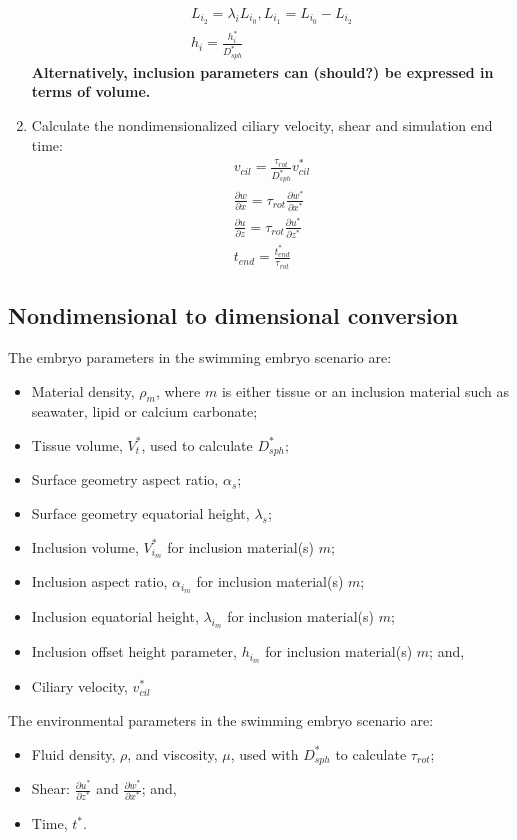 \documentclass[10pt,a4paper]{article}
\def\non{\nonumber}
\def\p{\partial}
\begin{document}
\begin{enumerate}
\begin{eqnarray}
		L_{i_2} = \lambda_i L_{i_0}, L_{i_1} = L_{i_0} - L_{i_2} \non \\
		h_i = \frac{h^*_i}{D_{sph}^*}
	\end{eqnarray}
\textbf{Alternatively, inclusion parameters can (should?) be expressed in terms of volume.}
	\item Calculate the nondimensionalized ciliary velocity, shear and simulation end time:
	\begin{eqnarray}\label{d2ndpars5}
		v_{cil} = \frac{{\tau_{rot}}}{D_{sph}^*}  v^*_{cil} \non \\
		\frac{\p w}{\p x} = \tau_{rot} \frac{\p w^*}{\p x^*} \non \\
		\frac{\p u}{\p z} = \tau_{rot} \frac{\p u^*}{\p z^*} \non \\
		t_{end} = \frac{t^*_{end}}{\tau_{rot}}
	\end{eqnarray}
\end{enumerate}
 
\subsection{Nondimensional to dimensional conversion}


The embryo parameters in the swimming embryo scenario are:
\begin{itemize}
	\item Material density, $\rho_m$, where $m$ is either tissue or an inclusion material such as seawater, lipid or calcium carbonate;
	\item Tissue volume, $V^*_t$, used to calculate $D_{sph}^*$;
	\item Surface geometry aspect ratio, $\alpha_s$;
	\item Surface geometry equatorial height, $\lambda_s$;
	\item Inclusion volume, $V^*_{i_m}$ for inclusion material(s) $m$;
	\item Inclusion aspect ratio, $\alpha_{i_m}$ for inclusion material(s) $m$;
	\item Inclusion equatorial height, $\lambda_{i_m}$ for inclusion material(s) $m$;
	\item Inclusion offset height parameter, $h_{i_m}$ for inclusion material(s) $m$; and,
	\item Ciliary velocity, $v^*_{cil}$
\end{itemize}
The environmental parameters in the swimming embryo scenario are:
\begin{itemize}
	\item Fluid density, $\rho$, and viscosity, $\mu$, used with $D_{sph}^*$ to calculate $\tau_{rot}$; 
	\item Shear: $\frac{\p u^*}{\p z^*}$ and $\frac{\p w^*}{\p x^*}$; and,
	\item Time, $t^*$.
\end{itemize}
\end{document}
